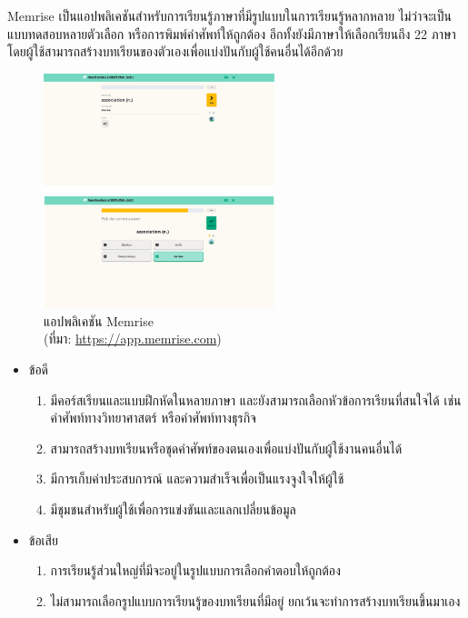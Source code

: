 \documentclass[12pt,oneside,openright,a4paper]{cpe-thai-project}
\begin{document}
\hspace{1cm}
Memrise \cite{Memrise} เป็นแอปพลิเคชันสำหรับการเรียนรู้ภาษาที่มีรูปแบบในการเรียนรู้หลากหลาย ไม่ว่าจะเป็นแบบทดสอบหลายตัวเลือก
หรือการพิมพ์คำศัพท์ให้ถูกต้อง อีกทั้งยังมีภาษาให้เลือกเรียนถึง 22 ภาษา โดยผู้ใช้สามารถสร้างบทเรียนของตัวเองเพื่อแบ่งปันกับผู้ใช้คนอื่นได้อีกด้วย

\begin{figure}[!h]\centering
	\includegraphics[width=0.6\textwidth, keepaspectratio=true]{image/chap2/memriseEX.png}
	\caption[แอปพลิเคชัน Memrise]{แอปพลิเคชัน Memrise \\ (ที่มา: \href {https://app.memrise.com} {https://app.memrise.com})\centering}\label{fig:mimriseEx}
\end{figure}

\begin{itemize}
	\item ข้อดี
	      \begin{enumerate}
		      \item มีคอร์สเรียนและแบบฝึกหัดในหลายภาษา และยังสามารถเลือกหัวข้อการเรียนที่สนใจได้ เช่นคำศัพท์ทางวิทยาศาสตร์ หรือคำศัพท์ทางธุรกิจ
		      \item สามารถสร้างบทเรียนหรือชุดคำศัพท์ของตนเองเพื่อแบ่งปันกับผู้ใช้งานคนอื่นได้
		      \item มีการเก็บค่าประสบการณ์ และความสำเร็จเพื่อเป็นแรงจูงใจให้ผู้ใช้
		      \item มีชุมชนสำหรับผู้ใช้เพื่อการแข่งขันและแลกเปลี่ยนข้อมูล
	      \end{enumerate}
	\item ข้อเสีย
	      \begin{enumerate}
		      \item การเรียนรู้ส่วนใหญ่ที่มีจะอยู่ในรูปแบบการเลือกคำตอบให้ถูกต้อง
		      \item ไม่สามารถเลือกรูปแบบการเรียนรู้ของบทเรียนที่มีอยู่ ยกเว้นจะทำการสร้างบทเรียนขึ้นมาเอง
	      \end{enumerate}
\end{itemize}
\end{document}
